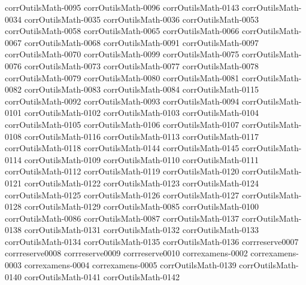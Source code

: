 {corrOutilsMath-0095}
{corrOutilsMath-0096}
{corrOutilsMath-0143}
{corrOutilsMath-0034}
{corrOutilsMath-0035}
{corrOutilsMath-0036}
{corrOutilsMath-0053}
{corrOutilsMath-0058}
{corrOutilsMath-0065}
{corrOutilsMath-0066}
{corrOutilsMath-0067}
{corrOutilsMath-0068}
{corrOutilsMath-0091}
{corrOutilsMath-0097}
{corrOutilsMath-0070}
{corrOutilsMath-0099}
{corrOutilsMath-0075}
{corrOutilsMath-0076}
{corrOutilsMath-0073}
{corrOutilsMath-0077}
{corrOutilsMath-0078}
{corrOutilsMath-0079}
{corrOutilsMath-0080}
{corrOutilsMath-0081}
{corrOutilsMath-0082}
{corrOutilsMath-0083}
{corrOutilsMath-0084}
{corrOutilsMath-0115}
{corrOutilsMath-0092}
{corrOutilsMath-0093}
{corrOutilsMath-0094}
{corrOutilsMath-0101}
{corrOutilsMath-0102}
{corrOutilsMath-0103}
{corrOutilsMath-0104}
{corrOutilsMath-0105}
{corrOutilsMath-0106}
{corrOutilsMath-0107}
{corrOutilsMath-0108}
{corrOutilsMath-0116}
{corrOutilsMath-0113}
{corrOutilsMath-0117}
{corrOutilsMath-0118}
{corrOutilsMath-0144}
{corrOutilsMath-0145}
{corrOutilsMath-0114}
{corrOutilsMath-0109}
{corrOutilsMath-0110}
{corrOutilsMath-0111}
{corrOutilsMath-0112}
{corrOutilsMath-0119}
{corrOutilsMath-0120}
{corrOutilsMath-0121}
{corrOutilsMath-0122}
{corrOutilsMath-0123}
{corrOutilsMath-0124}
{corrOutilsMath-0125}
{corrOutilsMath-0126}
{corrOutilsMath-0127}
{corrOutilsMath-0128}
{corrOutilsMath-0129}
{corrOutilsMath-0085}
{corrOutilsMath-0100}
{corrOutilsMath-0086}
{corrOutilsMath-0087}
{corrOutilsMath-0137}
{corrOutilsMath-0138}
{corrOutilsMath-0131}
{corrOutilsMath-0132}
{corrOutilsMath-0133}
{corrOutilsMath-0134}
{corrOutilsMath-0135}
{corrOutilsMath-0136}
{corrreserve0007}
{corrreserve0008}
{corrreserve0009}
{corrreserve0010}
{correxamens-0002}
{correxamens-0003}
{correxamens-0004}
{correxamens-0005}
{corrOutilsMath-0139}
{corrOutilsMath-0140}
{corrOutilsMath-0141}
{corrOutilsMath-0142}
